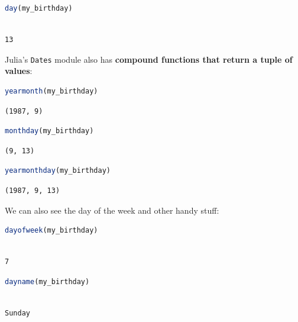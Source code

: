 \documentclass[
  notoc %
]{tufte-book}
\newcommand{\passthrough}[1]{#1}
\begin{document}
\begin{lstlisting}[language=Julia]
day(my_birthday)
\end{lstlisting}

\begin{lstlisting}[language=Output]

13

\end{lstlisting}

Julia's \passthrough{\lstinline!Dates!} module also has \textbf{compound
functions that return a tuple of values}:

\begin{lstlisting}[language=Julia]
yearmonth(my_birthday)
\end{lstlisting}

\begin{lstlisting}[language=Output]
(1987, 9)
\end{lstlisting}

\begin{lstlisting}[language=Julia]
monthday(my_birthday)
\end{lstlisting}

\begin{lstlisting}[language=Output]
(9, 13)
\end{lstlisting}

\begin{lstlisting}[language=Julia]
yearmonthday(my_birthday)
\end{lstlisting}

\begin{lstlisting}[language=Output]
(1987, 9, 13)
\end{lstlisting}

We can also see the day of the week and other handy stuff:

\begin{lstlisting}[language=Julia]
dayofweek(my_birthday)
\end{lstlisting}

\begin{lstlisting}[language=Output]

7

\end{lstlisting}

\begin{lstlisting}[language=Julia]
dayname(my_birthday)
\end{lstlisting}

\begin{lstlisting}[language=Output]

Sunday

\end{lstlisting}
\end{document}
